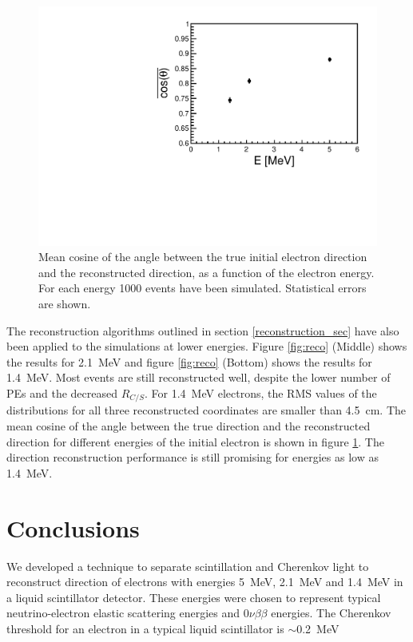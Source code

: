 \documentclass[cits]{JINST}
\begin{document}
\begin{figure}
        \begin{center}
        \includegraphics[scale=0.4]{graphs/hCos_vs_E_final.pdf}
        \caption[]{Mean cosine of the angle between the true initial electron direction and the reconstructed direction, as a function of the electron energy. For each energy 1000 events have been simulated. Statistical errors are
shown. \label{Edep_angle}}
        \end{center}
\end{figure}

The reconstruction algorithms outlined in section \ref{reconstruction_sec} have also been applied
to the simulations at lower energies. Figure \ref{fig:reco} (Middle) shows the results for 2.1~MeV and figure \ref{fig:reco} (Bottom) shows the results for 1.4~MeV. Most events are still reconstructed well, despite the lower
number of PEs and the decreased $R_{C/S}$. For 1.4~MeV electrons, the RMS values of the distributions for all three
reconstructed coordinates are smaller than 4.5~cm. The mean cosine of the angle between the true direction
and the reconstructed direction for different energies of the initial electron is shown in figure
\ref{Edep_angle}. The direction reconstruction performance is still promising for energies as low as 1.4~MeV.

\section{Conclusions}

We developed a technique to separate scintillation and Cherenkov light to reconstruct direction of electrons with energies 5~MeV, 2.1~MeV and 1.4~MeV in a liquid scintillator detector. These energies were chosen to represent typical neutrino-electron elastic scattering energies and
$0\nu\beta\beta$ energies. The Cherenkov threshold for an electron in a typical liquid scintillator is $\sim$0.2~MeV
\end{document}
